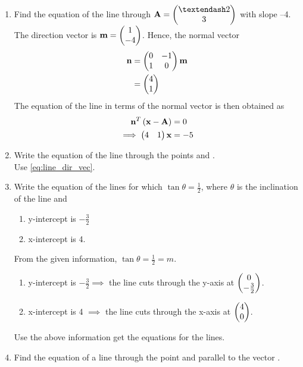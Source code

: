 \documentclass[journal,12pt,twocolumn]{IEEEtran}
\renewcommand\thesection{\arabic{section}}
\begin{document}
\begin{enumerate}[label=\thesection.\arabic*.,ref=\thesection.\theenumi]
\item Find the equation of the line through $\vec{A}=\myvec{– 2\\ 3}$ with slope –4.
\\
\solution The direction vector is $\mathbf{m} = \begin{pmatrix}1\\-4\end{pmatrix}$.  Hence, the normal vector
\begin{align}
\label{eq:line_norm_dir}
\mathbf{n} &= \begin{pmatrix}0&-1\\1&0\end{pmatrix}\mathbf{m} 
\\
&= \begin{pmatrix}4\\1\end{pmatrix}
\end{align}
%
The equation of the line in terms of the normal vector is then obtained as
\begin{align}
\label{eq:line_norm_vec}
\mathbf{n}^T\left(\mathbf{x}-\mathbf{A}\right) &= 0
\\
\implies \begin{pmatrix}4 & 1\end{pmatrix} \mathbf{x} &= -5
\end{align}
%
\item Write the equation of the line through the points  and .
%
\\
\solution Use \eqref{eq:line_dir_vec}.
\item Write the equation of the lines for which $\tan \theta = \frac{1}{2}$, where $\theta$ is the inclination of the line and 
\label{prob:line_intercept}
\begin{enumerate}
\item y-intercept is $-\frac{3}{2}$
\item x-intercept is 4.
\end{enumerate}
%
\solution From the given information, $\tan \theta = \frac{1}{2}=m $.
\begin{enumerate}
\item y-intercept is $-\frac{3}{2} \implies $ the line cuts through the y-axis at $\begin{pmatrix}0\\-\frac{3}{2}\end{pmatrix}$.
\item x-intercept is 4 $\implies$ the line cuts through the x-axis at $\begin{pmatrix}4\\0\end{pmatrix}$.
\end{enumerate}
%
Use the above information get the equations for the lines.
%
\item Find the equation of a line through the point  and parallel to the vector .

\end{enumerate}
\end{document}
